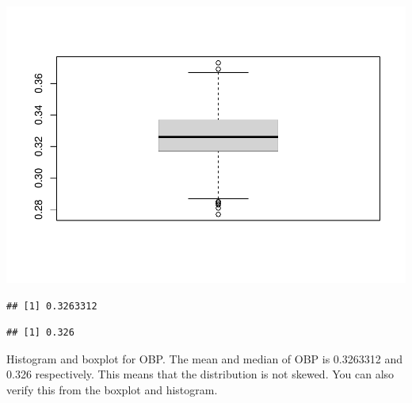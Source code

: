 \documentclass[
]{article}
\newenvironment{Shaded}{\begin{snugshade}}{\end{snugshade}}
\newcommand{\KeywordTok}[1]{\textcolor[rgb]{0.13,0.29,0.53}{\textbf{#1}}}
\newcommand{\NormalTok}[1]{#1}
\newcommand{\OperatorTok}[1]{\textcolor[rgb]{0.81,0.36,0.00}{\textbf{#1}}}
\begin{document}
\includegraphics{HW2_Liu-Zi-Jian_files/figure-latex/unnamed-chunk-30-2.pdf}

\begin{Shaded}
\end{Shaded}

\begin{verbatim}
## [1] 0.3263312
\end{verbatim}

\begin{Shaded}
\end{Shaded}

\begin{verbatim}
## [1] 0.326
\end{verbatim}

Histogram and boxplot for OBP. The mean and median of OBP is 0.3263312
and 0.326 respectively. This means that the distribution is not skewed.
You can also verify this from the boxplot and histogram.

\begin{Shaded}
\end{Shaded}
\end{document}
